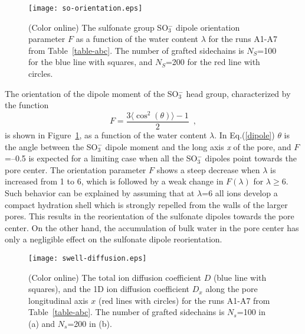 \documentclass[3p,english,preprint]{elsarticle}
\newcommand{\mage}[1]{\textcolor{black}{#1}}
\begin{document}
\begin{figure}  [!ht]
\begin{center}
\texttt{[image: so-orientation.eps]}
\end{center}
\vspace{-0.8cm}
\caption{(Color online) The sulfonate group SO$_3^-$  dipole orientation
  parameter $F$ as a function of the water content $\lambda$ for 
the runs A1-A7 from Table~\ref{table-abc}. 
The number of grafted sidechains is $N_S$=100 for the blue line with squares, 
and $N_S$=200 for the red line with circles.
\label{fig-7-new}}
\end{figure}


The orientation of the dipole moment of the  SO$_3^-$ head group, 
characterized by the function  
\begin{equation}
   F = \frac{3 \langle \cos^2(\theta) \rangle -1}{2} \,\,\, ,
\label{dipole}
\end{equation}
is shown in Figure~\ref{fig-7-new}, as a function of the water content $\lambda$. 
In Eq.(\ref{dipole})  $\theta$ is the angle  between the  SO$_3^-$  dipole moment and 
 the long axis {\it x}  of the pore, and $F$=--0.5 is expected for 
a limiting case when  all the SO$_3^-$ dipoles point towards the pore center. 
The orientation parameter $F$ shows a steep decrease when $\lambda$ is increased  from     
1 to 6, which is followed by a weak change in $F(\lambda)$ 
for $\lambda$$\ge$6. Such behavior can be explained  by  
assuming that at $\lambda$=6 all ions develop a compact hydration shell
 which  is strongly repelled from the walls of the larger pores. 
This results in the reorientation of the sulfonate dipoles towards the pore 
center. On the other hand, the accumulation of bulk water in the pore center
has only a negligible effect on the sulfonate dipole reorientation. 



\begin{figure} [!ht]
\begin{center}
\texttt{[image: swell-diffusion.eps]}
\end{center}
\caption{(Color online)
 The total ion  diffusion coefficient $D$ 
(blue line with squares), and the 1D ion diffusion coefficient $D_x$ along the pore longitudinal axis $x$ 
(red lines with circles) for  the runs A1-A7 from Table~\ref{table-abc}. 
The number of grafted sidechains is $N_s$=100 in (a) 
and $N_s$=200 in (b). 
 \label{fig-8-new}}
\end{figure}
\end{document}
